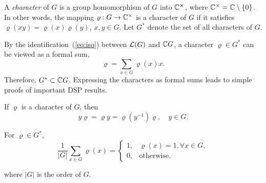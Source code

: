 A \emph{character} of $G$ is a group homomorphism of $G$
into $\mathbb{C}^{\times}$, where $\mathbb{C}^{\times} = \mathbb{C} \setminus \{0\}$.
In other words, the mapping $\varrho: G \to \mathbb{C}^{\times}$ is 
a character of $G$ if it satisfies 
$\varrho(xy) = \varrho(x)\varrho(y), \, x, y \in G$.
Let $G^*$ denote the set of all characters of $G$.

By the identification~(\ref{eq:iso}) between $\mathcal{L}(G)$ and
$\mathbb{C} G$, a character $\varrho \in G^*$ can be viewed as
a formal sum,
\begin{equation}
\varrho = \sum_{x\in G}\varrho(x)x.
\end{equation}
Therefore, $G^* \subset \mathbb{C} G$. 
Expressing the characters as formal sums 
leads to simple proofs of important DSP results.
\begin{theorem}\label{thm:char-action}
If $\varrho$ is a character of $G$, then
\begin{equation}
y\varrho = \varrho y = \varrho(y^{-1})\varrho, \quad y\in G.
\end{equation}
\end{theorem}
\begin{theorem}\label{thm:eigenvector}
For $\varrho\in G^*$,
\begin{equation}
\frac{1}{|G|} \sum_{x\in G} \varrho(x) = 
\begin{cases}  1, & \varrho(x)=1, \forall x\in G,\\
0, & \text{otherwise.}
\end{cases}
\end{equation}
\end{theorem}
where $|G|$ is the order of $G$.
